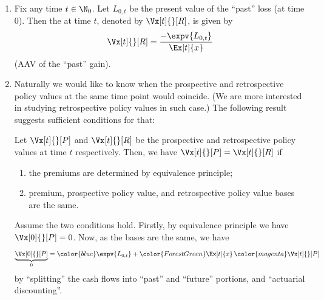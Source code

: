 \begin{enumerate}

For ``past'' \emph{gain}, we should treat cash inflow as positive and cash
outflow as negative. It is negative of ``past'' loss.

\item Fix any time \(t\in\N_0\). Let \(L_{0,t}\) be the present value of the
``past'' loss (at time 0). Then the  at time
\(t\), denoted by
\(\Vx[t]{}[R]\), is given by
\[
\Vx[t]{}[R]=\frac{-\expv{L_{0,t}}}{\Ex[t]{x}}
\]
(AAV of the ``past'' gain).

\item Naturally we would like to know when the prospective and retrospective
policy values at the same time point would coincide. (We are more interested in
studying retrospective policy values in such case.) The following result
suggests sufficient conditions for that:
\begin{proposition}
\label{prp:pro-retro-pv-equal}
Let \(\Vx[t]{}[P]\) and \(\Vx[t]{}[R]\) be the prospective and retrospective
policy values at time \(t\) respectively. Then, we have
\(\Vx[t]{}[P]=\Vx[t]{}[R]\) if
\begin{enumerate}
\item the premiums are determined by equivalence principle;

\item premium, prospective policy value, and retrospective policy value bases are the same.
\end{enumerate}
\end{proposition}
\begin{pf}
Assume the two conditions hold. Firstly, by equivalence principle we have
\(\Vx[0]{}[P]=0\). Now, as the bases are the same, we have
\[
\underbrace{\Vx[0]{}[P]}_{0}={\color{blue}\expv{L_{0,t}}}
+{\color{ForestGreen}\Ex[t]{x}}\,{\color{magenta}\Vx[t]{}[P]}
\]
by ``splitting'' the cash flows into ``past'' and ``future'' portions, and
``actuarial discounting''.


\end{pf}
\end{enumerate}

